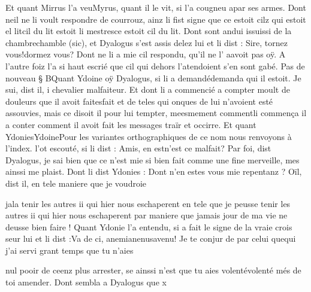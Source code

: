 \documentclass{article}
\begin{document}
\begin{pages}
                  Et quant Mirrus l’a
                     veuMyrus, quant il le vit, si l’a cougneu 
                  apar ses armes. Dont 
                  neil ne li voult respondre de courrouz, ainz li fist signe que 
                  ce estoit cilz qui estoit el litcil du lit estoit li mestresce estoit cil du lit. Dont sont andui 
                  issuissi de la 
                  chambrechamble (sic), et Dyalogus s’est assis delez lui et li
               dist : Sire, 
                     tornez vous!dormez vous? Dont ne li a mie 
                  cil respondu, qu’il ne l’
                  aavoit pas oÿ. A l’autre foiz l’a si haut escrié que cil qui dehors l’atendoient s’en
               sont gabé. \pend
            \pstart 
               Pas de nouveau § BQuant Ydoine oÿ Dyalogus, si
               li 
                  a demandédemanda
               qui il estoit. Je sui, dist il, i chevalier malfaiteur. Et dont
               li a commencié a compter moult de douleurs que il
                  avoit 
                     faitesfait et de teles qui onques de lui n’avoient esté assouvies, mais ce
               disoit il pour lui tempter, meesmement 
                  commentli commença il a conter comment il avoit fait les messages traïr et occirre. Et quant 
                     YdoniesYdoinePour les variantes orthographiques de
                  ce nom nous renvoyons à l'index. l’ot escouté, si li dist : Amis, 
                     en estn'est ce malfait?
               Par foi, dist Dyalogus, je sai bien que ce n’est mie si bien fait 
                     comme une fine merveille, mes ainssi me plaist. Dont li dist Ydonies : Dont n’en estes vous mie
                  repentanz ?
               Oïl, dist il, en tele maniere que je voudroie 
                     
                           jala tenir les autres ii qui hier nous eschaperent en tele que je peusse tenir les autres ii qui hier nous
                        eschaperent par maniere que jamais jour de ma vie ne deusse bien faire ! \pend
            \pstart Quant Ydonie l’a
               entendu, si a fait le signe de la vraie crois seur lui et 
                  li dist :Va de ci, 
                     anemianenusavenu! Je te conjur de par celui 
                     quequi j’ai servi grant temps que tu n'aies

                     nul pooir de ceenz plus arrester, se ainssi n’est que 
                     tu aies volentévolenté més de toi amender. Dont sembla a Dyalogus que x
               

\end{pages}
\end{document}
